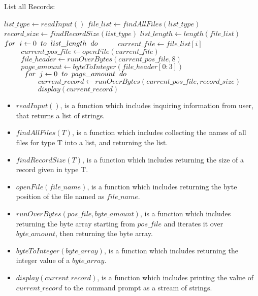 \documentclass[12pt]{report}
\begin{document}
\begin{algorithm}
\caption{List all Records:}
\begin{algorithmic}[1]
	\STATE $list\_type \leftarrow readInput()$
	\STATE $file\_list \leftarrow findAllFiles(list\_type)$
	\STATE $record\_size \leftarrow findRecordSize(list\_type)$
	\STATE $list\_length \leftarrow length(file\_list)$
	\STATE $for\hspace{0.2cm}i\leftarrow0\hspace{0.2cm}to\hspace{0.2cm}list\_length\hspace{0.2cm}do$
	\STATE $\hspace{1cm}current\_file \leftarrow file\_list[i]$
	\STATE $\hspace{1cm}current\_pos\_file \leftarrow openFile(current\_file)$
	\STATE $\hspace{1cm}file\_header \leftarrow runOverBytes(current\_pos\_file, 8)$
	\STATE $\hspace{1cm}page\_amount \leftarrow byteToInteger(file\_header[0:3])$
	\STATE $\hspace{1cm}for\hspace{0.2cm}j\leftarrow0\hspace{0.2cm}to\hspace{0.2cm}page\_amount\hspace{0.2cm}do$
	\STATE $\hspace{2cm}current\_record \leftarrow runOverBytes(current\_pos\_file, record\_size)$
	\STATE $\hspace{2cm}display(current\_record)$
\end{algorithmic}
\end{algorithm}

\begin{itemize}
\item $readInput()$, is a function which includes inquiring information from user, that returns a list of strings.
\item $findAllFiles(T)$, is a function which includes collecting the names of all files for type T into a list, and returning the list.
\item $findRecordSize(T)$, is a function which includes returning the size of a record given in type T.
\item $openFile(file\_name)$, is a function which includes returning the byte position of the file named as $file\_name$.
\item $runOverBytes(pos\_file, byte\_amount)$, is a function which includes returning the byte array starting from $pos\_file$ and iterates it over $byte\_amount$, then returning the byte array.
\item $byteToInteger(byte\_array)$, is a function which includes returning the integer value of a $byte\_array$.
\item $display(current\_record)$, is a function which includes printing the value of $current\_record$ to the command prompt as a stream of strings.
\end{itemize}
\end{document}
